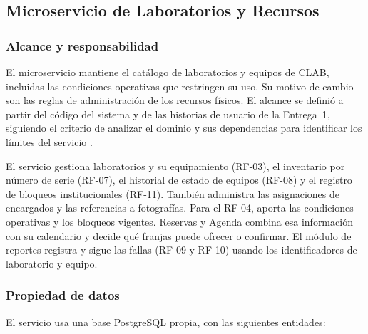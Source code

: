 \subsection{Microservicio de Laboratorios y Recursos}
\label{subsec:laboratorios-recursos}

\subsubsection{Alcance y responsabilidad}

El microservicio mantiene el catálogo de laboratorios y equipos de CLAB,
incluidas las condiciones operativas que restringen su uso. Su motivo de
cambio son las reglas de administración de los recursos físicos. El alcance
se definió a partir del código del sistema y de las historias de usuario de
la Entrega~1, siguiendo el criterio de analizar el dominio y sus dependencias
para identificar los límites del servicio
\cite{abgaz2023decomposition,oumoussa2024evolution}.

El servicio gestiona laboratorios y su equipamiento (RF-03), el inventario
por número de serie (RF-07), el historial de estado de equipos (RF-08) y
el registro de bloqueos institucionales (RF-11). También administra las
asignaciones de encargados y las referencias a fotografías. Para el RF-04,
aporta las condiciones operativas y los bloqueos vigentes. Reservas y Agenda
combina esa información con su calendario y decide qué franjas puede
ofrecer o confirmar. El módulo de reportes registra y sigue las fallas
(RF-09 y RF-10) usando los identificadores de laboratorio y equipo.

\subsubsection{Propiedad de datos}

El servicio usa una base PostgreSQL propia, con las siguientes entidades:

